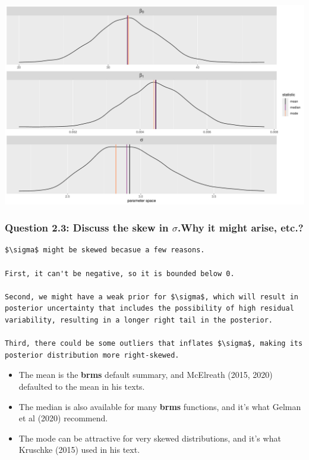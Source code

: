 \documentclass[
  letterpaper,
  DIV=11,
  numbers=noendperiod]{scrartcl}
\providecommand{\tightlist}{%
  \setlength{\itemsep}{0pt}\setlength{\parskip}{0pt}}\usepackage{longtable,booktabs,array}
\begin{document}
\includegraphics{Bayes_Lab_1_files/figure-pdf/unnamed-chunk-48-1.pdf}

\subsubsection{\texorpdfstring{Question 2.3: Discuss the skew in
\(\sigma\).Why it might arise,
etc.?}{Question 2.3: Discuss the skew in \textbackslash sigma.Why it might arise, etc.?}}\label{question-2.3-discuss-the-skew-in-sigma.why-it-might-arise-etc.}

\begin{verbatim}
$\sigma$ might be skewed becasue a few reasons.

First, it can't be negative, so it is bounded below 0.

Second, we might have a weak prior for $\sigma$, which will result in posterior uncertainty that includes the possibility of high residual variability, resulting in a longer right tail in the posterior.

Third, there could be some outliers that inflates $\sigma$, making its posterior distribution more right-skewed.
\end{verbatim}

\begin{itemize}
\tightlist
\item
  The mean is the \textbf{brms} default summary, and McElreath (2015,
  2020) defaulted to the mean in his texts.
\item
  The median is also available for many \textbf{brms} functions, and
  it's what Gelman et al (2020) recommend.
\item
  The mode can be attractive for very skewed distributions, and it's
  what Kruschke (2015) used in his text.
\end{itemize}
\end{document}

